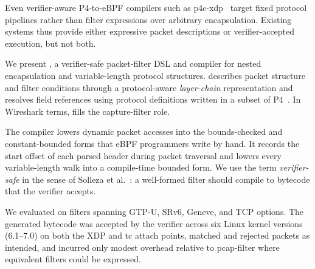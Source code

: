 Even verifier-aware P4-to-eBPF compilers such as
p4c-xdp~\cite{tu2018p4cxdp} target fixed protocol pipelines rather than
filter expressions over arbitrary encapsulation. Existing systems thus
provide either expressive packet descriptions or verifier-accepted
execution, but not both.

We present \kunai, a verifier-safe packet-filter DSL and compiler for
nested encapsulation and variable-length protocol structures. \kunai
describes packet structure and filter conditions through a
protocol-aware \emph{layer-chain} representation and resolves field
references using protocol definitions written in a subset of
P4~\cite{p4spec}. In Wireshark terms, \kunai fills the capture-filter
role.

The compiler lowers dynamic packet accesses into the bounds-checked
and constant-bounded forms that eBPF programmers write by hand. It
records the start offset of each parsed header during packet
traversal and lowers every variable-length walk into a compile-time
bounded form. We
use the term \emph{verifier-safe} in the sense of Solleza et
al.~\cite{solleza2025verifiersafe}: a well-formed filter should
compile to bytecode that the verifier accepts.

We evaluated \kunai on filters spanning GTP-U, SRv6, Geneve, and TCP
options. The generated bytecode was accepted by the verifier across
six Linux kernel versions (6.1–7.0) on both the XDP and tc attach points,
matched and rejected packets as intended, and incurred only modest
overhead relative to pcap-filter where equivalent filters could be
expressed.